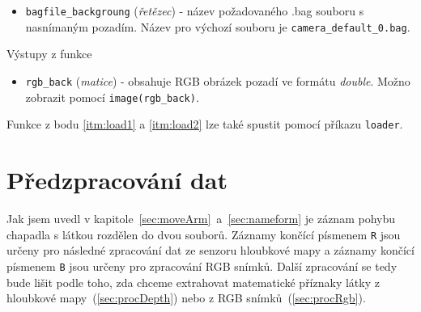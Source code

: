 \documentclass[10pt,a4paper,titlepage,oneside]{report}
\begin{document}
\begin{enumerate}
\begin{itemize}
  			\item \verb|bagfile_backgroung| (\textit{řetězec}) - název požadovaného .bag souboru s nasnímaným pozadím. Název pro výchozí souboru je \verb|camera_default_0.bag|.
    			\end{itemize}
    		Výstupy z funkce
        		\begin{itemize}
  			\item \verb|rgb_back| (\textit{matice}) - obsahuje RGB obrázek pozadí ve formátu \textit{double}. Možno zobrazit pomocí \verb|image(rgb_back)|.
    			\end{itemize}
Funkce z bodu \ref{itm:load1} a \ref{itm:load2} lze také spustit pomocí příkazu \verb|loader|.   
\end{enumerate}
%
\section{Předzpracování dat}
Jak jsem uvedl v kapitole~\ref{sec:moveArm}~a~\ref{sec:nameform} je záznam pohybu chapadla s látkou rozdělen do dvou souborů. Záznamy končící písmenem \verb|R| jsou určeny pro následné zpracování dat ze senzoru hloubkové mapy a záznamy končící písmenem \verb|B| jsou určeny pro zpracování RGB snímků. Další zpracování se tedy bude lišit podle toho, zda chceme extrahovat matematické příznaky látky z hloubkové mapy~(\ref{sec:procDepth}) nebo z RGB snímků~(\ref{sec:procRgb}).
\end{document}
